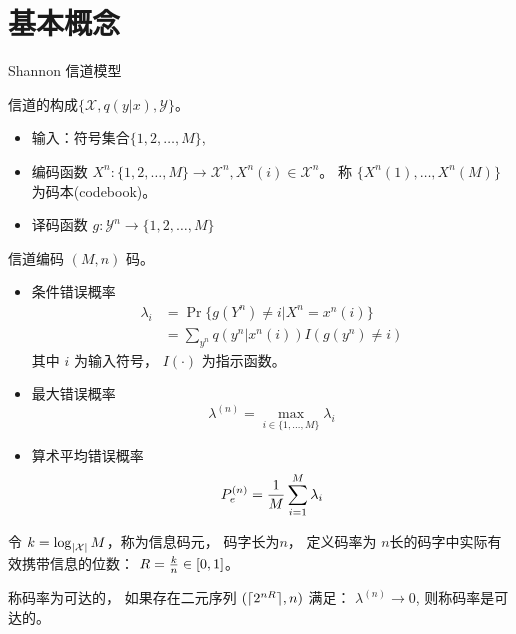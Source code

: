 \documentclass{article}
\DeclarePairedDelimiter\ceil{\lceil}{\rceil}
\DeclarePairedDelimiter\abs{\lvert}{\rvert}
\def\X{\mathcal{X}}
\def\Y{\mathcal{Y}}
\begin{document}
\section{基本概念}
Shannon 信道模型

信道的构成$\{\X, q(y|x), \Y\}$。
\begin{itemize}
\item 输入：符号集合$\{1, 2, \dots, M\}$,
\item 编码函数 $X^n : \{1, 2, \dots, M\} \to \X^n, X^n(i) \in \X^n$。
称 $\{X^n(1), \dots, X^n(M)\}$为码本(codebook)。
\item 译码函数 $g: \Y^n \to \{1, 2, \dots, M\}$
\end{itemize}
信道编码 $(M, n)$ 码。

\begin{itemize}
\item 条件错误概率
\begin{align*}
\lambda_i & =  \Pr\{g(Y^n) \neq i | X^n = x^n(i) \} \\
& = \sum_{y^n} q(y^n | x^n(i)) I(g(y^n) \neq i)
\end{align*}
其中 $i$ 为输入符号， $I(\cdot)$ 为指示函数。
\item 最大错误概率 $$\lambda^{(n)} = \max_{ i \in \{1, \dots, M\}} \lambda_i$$
\item 算术平均错误概率
$$ P_e^{(n)} = {1 \over M} \sum_{i=1}^M \lambda_i$$
\end{itemize}

令 $ k = \log_{\abs{\X}} M$，称为信息码元， 码字长为$n$， 定义码率为
$n$长的码字中实际有效携带信息的位数： 
$ R = { k \over n} \in [0,1]$。

称码率为可达的， 如果存在二元序列 $(\ceil{2^{nR}}, n)$ 满足：
$ \lambda^{(n)} \to 0$, 则称码率是可达的。
\end{document}
